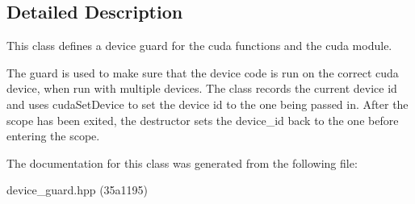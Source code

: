 \subsection{Detailed Description}
This class defines a device guard for the cuda functions and the cuda module. 

The guard is used to make sure that the device code is run on the correct cuda device, when run with multiple devices. The class records the current device id and uses {\ttfamily cuda\+Set\+Device} to set the device id to the one being passed in. After the scope has been exited, the destructor sets the device\+\_\+id back to the one before entering the scope. 

The documentation for this class was generated from the following file\+:\begin{DoxyCompactItemize}
\item 
device\+\_\+guard.\+hpp (35a1195)\end{DoxyCompactItemize}
